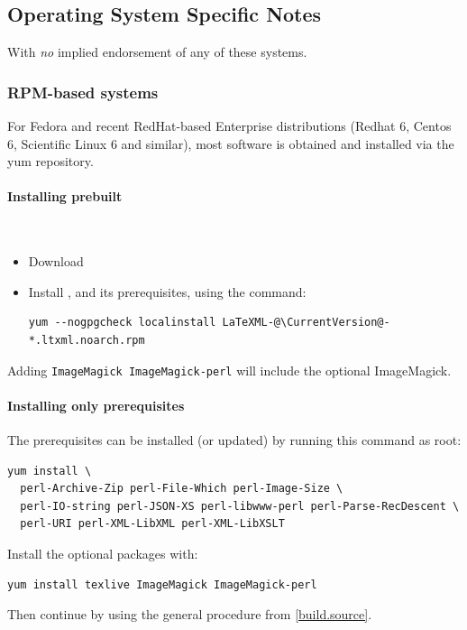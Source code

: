 \documentclass{article}
\begin{document}
\subsection[OS-Specific Notes]{Operating System Specific Notes}\label{install.osnotes}
With \emph{no} implied endorsement of any of these systems.

\subsubsection[RPM-based systems]{RPM-based systems}\label{install.fedora}
For Fedora and recent RedHat-based Enterprise distributions
(Redhat 6, Centos 6, Scientific Linux 6 and similar),
most software is obtained and installed via the yum repository.

\paragraph{Installing prebuilt}\\
\begin{itemize}
\item Download \CurrentFedora
\item Install \LaTeXML, and its prerequisites, using the command:
\begin{lstlisting}[style=shell]
yum --nogpgcheck localinstall LaTeXML-@\CurrentVersion@-*.ltxml.noarch.rpm
\end{lstlisting}
\end{itemize}
Adding \texttt{ImageMagick ImageMagick-perl} will include the optional ImageMagick.

\paragraph{Installing only prerequisites}
The prerequisites can be installed (or updated) by running this command as root: 
\begin{lstlisting}[style=shell]
yum install \
  perl-Archive-Zip perl-File-Which perl-Image-Size \
  perl-IO-string perl-JSON-XS perl-libwww-perl perl-Parse-RecDescent \
  perl-URI perl-XML-LibXML perl-XML-LibXSLT
\end{lstlisting}
Install the optional packages with:
\begin{lstlisting}[style=shell]
yum install texlive ImageMagick ImageMagick-perl
\end{lstlisting}
Then continue by using the general procedure from \ref{build.source}.

\end{document}
